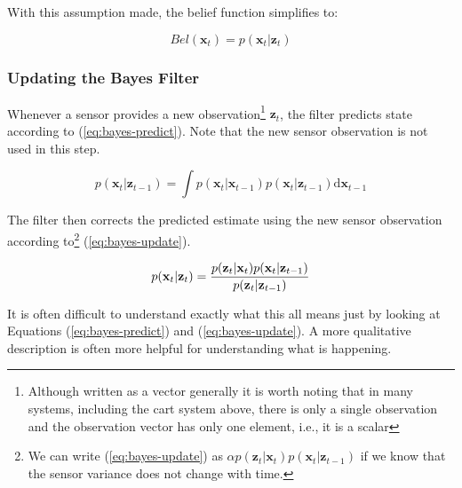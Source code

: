 With this assumption made, the belief function simplifies to:

\begin{equation}\label{eq:markov-belief}
Bel(\mathbf{x}_{t}) = p(\mathbf{x}_{t} | \mathbf{z}_{t})
\end{equation}

\subsubsection{Updating the Bayes Filter}\label{sec:updating-bayes}
Whenever a sensor provides a new observation\footnote{
    Although written as a vector generally it is worth noting that in many systems,
    including the cart system above, there is only a single observation and the
    observation vector has only one element, i.e., it is a scalar}
$\mathbf{z}_{t}$, the filter predicts state according
to (\ref{eq:bayes-predict}). Note that the new sensor observation is not used in this step.

\begin{equation}\label{eq:bayes-predict}
p(\mathbf{x}_{t} | \mathbf{z}_{t-1}) = \int{p(\mathbf{x}_{t} | \mathbf{x}_{t-1})
p(\mathbf{x}_{t} | \mathbf{z}_{t-1})\mathrm{d}\mathbf{x}_{t-1}}
\end{equation}

The filter then corrects the predicted estimate using the new sensor observation
according to\footnote{
We can write (\ref{eq:bayes-update}) as
$\alpha p(\mathbf{z}_{t} | \mathbf{x}_{t})p(\mathbf{x}_{t} | \mathbf{z}_{t-1})$
if we know that the sensor variance does not change with time.
}
    (\ref{eq:bayes-update}).

\begin{equation}\label{eq:bayes-update}
    p(\mathbf{x}_{t} | \mathbf{z}_{t}) =
    \frac
    {p(\mathbf{z}_{t} | \mathbf{x}_{t})p(\mathbf{x}_{t} | \mathbf{z}_{t-1})}
    {p(\mathbf{z}_{t} | \mathbf{z}_{t-1})}\\
\end{equation}


It is often difficult to understand exactly what this all means just by looking at
Equations (\ref{eq:bayes-predict}) and (\ref{eq:bayes-update}).
A more qualitative description is often more helpful for understanding what is
happening.

